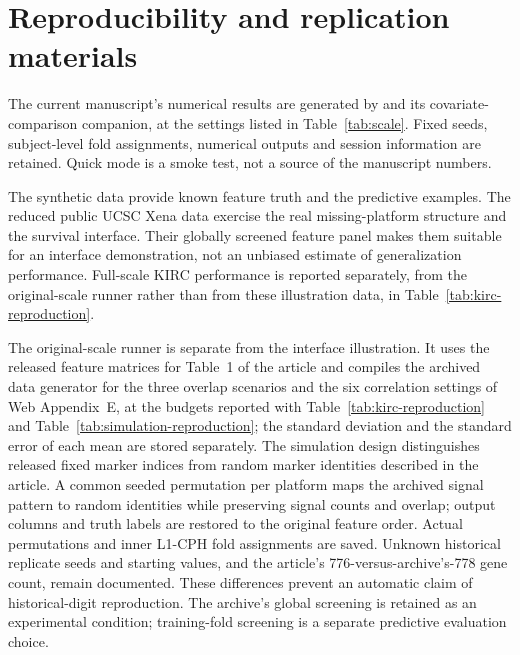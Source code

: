 \documentclass[article]{jss}
\begin{document}
\section{Reproducibility and replication materials}\label{sec:reproducibility}

The current manuscript's numerical results are generated by
 and its covariate-comparison companion, at
the settings listed in Table~\ref{tab:scale}. Fixed seeds, subject-level fold
assignments, numerical outputs and session information are retained. Quick mode
is a smoke test, not a source of the manuscript numbers.

The synthetic  data provide known feature truth and the predictive
examples. The reduced public UCSC Xena  data exercise the real
missing-platform structure and the survival interface. Their globally screened
feature panel makes them suitable for an interface demonstration, not an unbiased
estimate of generalization performance. Full-scale KIRC performance is reported
separately, from the original-scale runner rather than from these illustration
data, in Table~\ref{tab:kirc-reproduction}.

The original-scale runner is separate from the interface illustration. It
uses the released feature matrices for Table~1 of the article and compiles the
archived data generator for the three overlap scenarios and the six correlation
settings of Web Appendix~E, at the budgets reported with
Table~\ref{tab:kirc-reproduction} and Table~\ref{tab:simulation-reproduction};
the standard deviation and the standard error of each mean are stored
separately. The simulation design distinguishes released fixed marker indices from
random marker identities described in the article. A common seeded permutation
per platform maps the archived signal pattern to random identities while
preserving signal counts and overlap; output columns and truth labels are
restored to the original feature order. Actual permutations and inner L1-CPH
fold assignments are saved. Unknown historical replicate seeds and starting
values, and the article's 776-versus-archive's-778 gene count, remain
documented. These differences prevent an automatic claim of historical-digit
reproduction.
The archive's global screening is retained as an experimental condition;
training-fold screening is a separate predictive evaluation choice.
\end{document}
